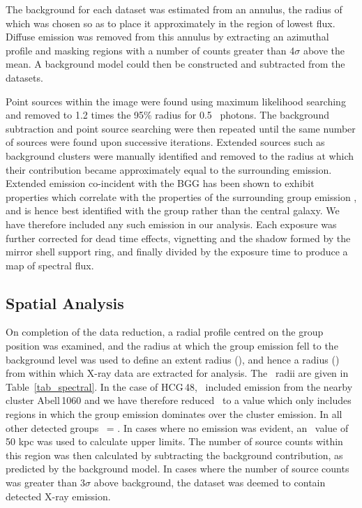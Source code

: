 \documentclass[usenatbib]{mn2e}
\begin{document}
The background for each dataset was estimated from an annulus, the radius of
which was chosen so as to place it approximately in the region of lowest flux.
Diffuse emission was removed from this annulus by extracting an azimuthal profile
and masking regions with a number of counts greater than 4$\sigma$ above the
mean.  A background model could then be constructed and subtracted from the
datasets.

Point sources within the image were found using maximum likelihood searching and
removed to 1.2 times the 95\% radius for 0.5 \kev\ photons.  The background
subtraction and point source searching were then repeated until the same number
of sources were found upon successive iterations.  Extended sources such as
background clusters were manually identified and removed to the radius at which
their contribution became approximately equal to the surrounding emission.
Extended emission co-incident with the BGG has been shown to exhibit properties
which correlate with the properties of the surrounding group emission
\citep{helsdon00a}, and is hence best identified with the group rather than the
central galaxy.  We have therefore included any such emission in our analysis.
Each exposure was further corrected for dead time effects, vignetting and the
shadow formed by the mirror shell support ring, and finally divided by the
exposure time to produce a map of spectral flux.


\subsection{Spatial Analysis}
\label{sec_spatial}

On completion of the data reduction, a radial profile centred on the group
position was examined, and the radius at which the group emission fell to the
background level was used to define an extent radius (\rext), and hence a radius
(\rcut) from within which X-ray data are extracted for analysis.  The \rcut\
radii are given in Table~\ref{tab_spectral}.  In the case of HCG\,48, \rext\
included emission from the nearby cluster Abell\,1060 and we have therefore
reduced \rcut\ to a value which only includes regions in which the group emission
dominates over the cluster emission.  In all other detected groups \rcut\ =
\rext.  In cases where no emission was evident, an \rcut\ value of 50 kpc was
used to calculate upper limits. The number of source counts within this region
was then calculated by subtracting the background contribution, as predicted by
the background model.  In cases where the number of source counts was greater
than 3$\sigma$ above background, the dataset was deemed to contain detected
X-ray emission.
\end{document}
